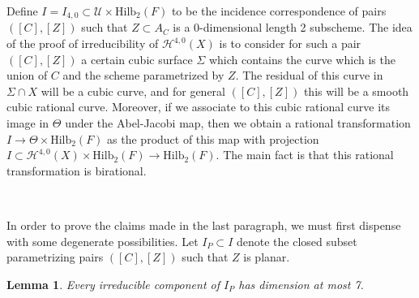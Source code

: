 \documentclass[twoside,12pt,reqno]{amsart}
\theoremstyle{plain}
\newtheorem{lem}[thm]{Lemma}
\theoremstyle{definition}
\newcommand{\Hdg}[2]{\mathcal{H}^{#1,#2}}
\newcommand{\HI}[2]{\text{Hilb}_{#1}(#2)}
\def\ps{\vspace{4pt}}
\begin{document}
\ps

Define $I=I_{4,0}\subset \mathcal{U}\times \HI{2}F$ to be the incidence
correspondence of pairs $([C],[Z])$ such that $Z\subset A_C$ is a
0-dimensional length 2 subscheme.  The idea of the proof of
irreducibility of $\Hdg{4}{0}(X)$ is to consider for such a pair
$([C],[Z])$ a certain cubic surface $\Sigma$ which contains the curve
which is the union of $C$ and the scheme parametrized by $Z$.  The
residual of this curve in $\Sigma\cap X$ will be a cubic curve, and
for general $([C],[Z])$ this will be a smooth cubic rational curve.
Moreover, if we associate to this cubic rational curve its image in
$\Theta$ under the Abel-Jacobi map, then we obtain a rational
transformation $I\rightarrow \Theta \times \HI{2}{F}$ as the
product of this map with projection $I\subset \Hdg{4}{0}(X)\times
\HI{2}{F} \rightarrow \HI{2}{F}$.  The main fact is that this rational 
transformation is birational.  

\

In order to prove the claims made in the last paragraph, we must first 
dispense with some degenerate possibilities.  Let $I_P\subset I$
denote the closed subset parametrizing pairs $([C],[Z])$ such that $Z$ 
is planar.  

\begin{lem}\label{lem-planar}  Every irreducible component of $I_P$
has dimension at most 7.
\end{lem}
\end{document}
